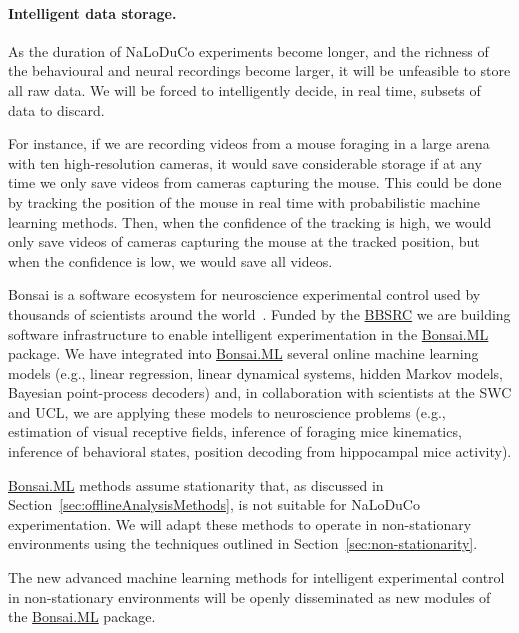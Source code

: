 \paragraph{Intelligent data storage.}
%
As the duration of NaLoDuCo experiments become longer, and the richness of the
behavioural and neural recordings become larger, it will be unfeasible to
store all raw data. We will be forced to intelligently decide, in real time,
subsets of data to discard.

For instance, if we are recording videos from a mouse foraging in a large arena
with ten high-resolution cameras, it would save considerable storage if at any
time we only save videos from cameras capturing the mouse.  This
could be done by tracking the position of the mouse in real time with
probabilistic machine learning methods. Then, when the confidence of the
tracking is high, we would only save videos of cameras capturing the mouse at
the tracked position, but when the confidence is low, we would save all videos.


Bonsai is a software ecosystem for neuroscience experimental control used by
thousands of scientists around the world~\citep{lopesEtAl15}.
%
Funded by the
\href{https://gow.bbsrc.ukri.org/grants/AwardDetails.aspx?FundingReference=BB\%2FW019132\%2F1}{BBSRC}
we are building software infrastructure to enable intelligent experimentation
in the \href{https://bonsai-rx.org/machinelearning/}{Bonsai.ML}
package.
%
We have integrated into
\href{https://bonsai-rx.org/machinelearning/}{Bonsai.ML} several online machine
learning models (e.g., linear regression, linear dynamical systems, hidden
Markov models, Bayesian point-process decoders) and, in collaboration with scientists at the
SWC and UCL, we are applying these models to neuroscience problems (e.g.,
estimation of visual receptive fields, inference of foraging mice kinematics,
inference of behavioral states, position decoding from hippocampal mice
activity).

\href{https://bonsai-rx.org/machinelearning/}{Bonsai.ML} methods assume
stationarity that, as discussed in Section~\ref{sec:offlineAnalysisMethods}, is
not suitable for NaLoDuCo experimentation. We will adapt these methods to
operate in non-stationary environments using the techniques outlined in
Section~\ref{sec:non-stationarity}.

The new advanced machine learning methods for intelligent experimental control in
non-stationary environments will be openly disseminated as new modules of the
\href{https://bonsai-rx.org/machinelearning/}{Bonsai.ML} package.

